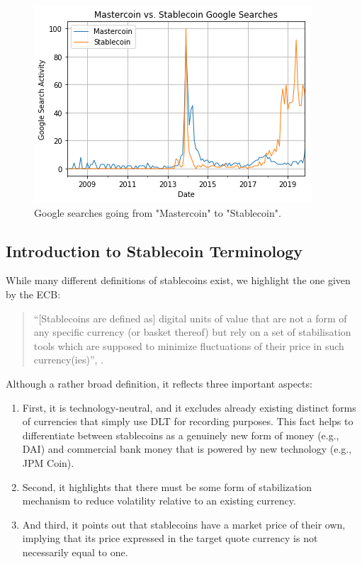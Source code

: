 \documentclass[conference]{IEEEtran}
\begin{document}
\begin{figure}[htbp]
	\centerline{
		\includegraphics[width=\linewidth]{assets/googleSearchActivity.png}
		}
	\caption{Google searches going from "Mastercoin" to "Stablecoin".}
	\label{fig:mastercoin}
\end{figure}

\subsection{Introduction to Stablecoin Terminology}
While many different definitions of stablecoins exist, we highlight the one given by the \ac{ECB}:

\begin{quote}
	\textquotedblleft [Stablecoins are defined as] digital units of value that are not a form of any specific currency (or basket thereof) but rely on a set of stabilisation tools which are supposed to minimize fluctuations of their price in such currency(ies)\textquotedblright, \cite{ECB}.
\end{quote}

Although a rather broad definition, it reflects three important aspects:
\begin{enumerate}
	\item First, it is technology-neutral, and it excludes already existing distinct forms of currencies that simply use \ac{DLT} for recording purposes. This fact helps to differentiate between stablecoins as a genuinely new form of money (e.g., DAI) and commercial bank money that is powered by new technology (e.g., JPM Coin).
	\item Second, it highlights that there must be some form of stabilization mechanism to reduce volatility relative to an existing currency.
	\item And third, it points out that stablecoins have a market price of their own, implying that its price expressed in the target quote currency is not necessarily equal to one.
\end{enumerate}
\end{document}
